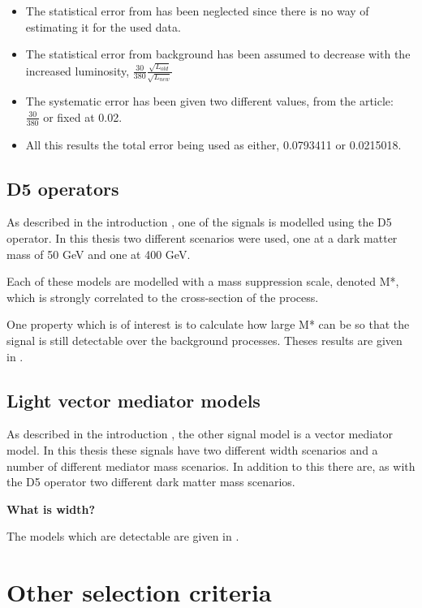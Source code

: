 \begin{itemize}
\item The statistical error from \abbrMC has been neglected since there is no way of estimating it for the used data.
\item The statistical error from background \abbrCR has been assumed to decrease with the increased luminosity, $\frac{30}{380} \frac{\sqrt{L_{old}}}{\sqrt{L_{new}}}$
\item The systematic error has been given two different values, from the article:\\ $\frac{30}{380}$ or fixed at 0.02.
\item All this results the total error being used as either, 0.0793411 or 0.0215018. 
\end{itemize}

\subsection{D5 operators}\label{sec:signal:subsec:d5}
As described in the introduction , one of the signals is modelled using the D5 operator. In this thesis two different scenarios were used, one at a dark matter mass of 50 GeV and one at 400 GeV.

Each of these models are modelled with a mass suppression scale, denoted M*, which is strongly correlated to the cross-section of the process.

One property which is of interest is to calculate how large M* can be so that the signal is still detectable over the background processes. Theses results are given in .

\subsection{Light vector mediator models}
As described in the introduction , the other signal model is a vector mediator model. In this thesis these signals have two different width scenarios and a number of different mediator mass scenarios. In addition to this there are, as with the D5 operator two different dark matter mass scenarios.

\textbf{What is width?}

The models which are detectable are given in .
 
\newpage
\section{Other selection criteria}
